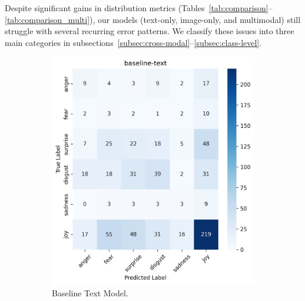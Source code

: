 Despite significant gains in distribution metrics (Tables~\ref{tab:comparison}--\ref{tab:comparison_multi}), our models (text-only, image-only, and multimodal) still struggle with several recurring error patterns. We classify these issues into three main categories in subsections~\ref{subsec:cross-modal}--\ref{subsec:class-level}.

\begin{figure}[h]
    \centering
    \begin{subfigure}[b]{0.48\textwidth}
        \includegraphics[width=\textwidth]{images/confusion_matrix_baseline_text_dist.png}
        \caption{Baseline Text Model.}
        \label{fig:text-confusion-baseline}
    \end{subfigure}
    \hfill
    \begin{subfigure}[b]{0.48\textwidth}

\end{subfigure}
\end{figure}
